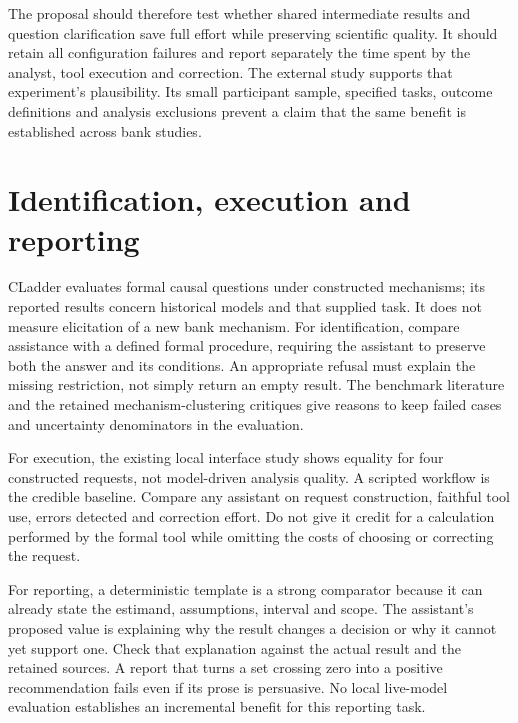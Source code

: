 The proposal should therefore test whether shared intermediate results and
question clarification save full effort while preserving scientific quality.
It should retain all configuration failures and report separately the time
spent by the analyst, tool execution and correction. The external study
supports that experiment's plausibility. Its small participant sample,
specified tasks, outcome definitions and analysis exclusions prevent a
claim that the same benefit is established across bank studies.

\section{Identification, execution and reporting}
CLadder evaluates formal causal questions under constructed mechanisms;
its reported results concern historical models and that supplied task.
It does not measure elicitation of a new bank mechanism.
\citep{v12_la_2312_04350}
For identification, compare assistance with a defined formal procedure,
requiring the assistant to preserve both the answer and its conditions.
An appropriate refusal must explain the missing restriction, not simply
return an empty result. The benchmark literature and the retained
mechanism-clustering critiques give reasons to keep failed cases and
uncertainty denominators in the evaluation.

For execution, the existing local interface study shows equality for four
constructed requests, not model-driven analysis quality. A scripted
workflow is the credible baseline. Compare any assistant on request
construction, faithful tool use, errors detected and correction effort.
Do not give it credit for a calculation performed by the formal tool
while omitting the costs of choosing or correcting the request.

For reporting, a deterministic template is a strong comparator because
it can already state the estimand, assumptions, interval and scope.
The assistant's proposed value is explaining why the result changes a
decision or why it cannot yet support one. Check that explanation
against the actual result and the retained sources. A report that turns
a set crossing zero into a positive recommendation fails even if its
prose is persuasive. No local live-model evaluation establishes an
incremental benefit for this reporting task.

